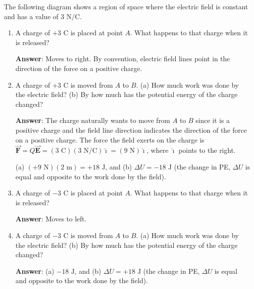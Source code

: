\documentclass{article}
\newcommand{\ihat}[0]{\hat{\boldsymbol{\imath}}}
\newcommand{\bfvec}[1]{\vec{\mathbf{#1}}}
\begin{document}
The following diagram shows a region of space where the electric field is constant and has a value of $3\text{ N/C}$.



\begin{enumerate}

  \item A charge of $+3\text{ C}$ is placed at point $A$. What happens to that charge when it is released?

        \ifsolutions
        {\bf Answer}: Moves to right. By convention, electric field lines point in the direction of the force on a positive charge.
        \else

        \vskip 36pt
        \fi

  \item A charge of $+3\text{ C}$ is moved from $A$ to $B$. (a) How much work was done by the electric field? (b) By how much has the potential energy of the charge changed?

        \ifsolutions
        {\bf Answer}: The charge naturally wants to move from $A$ to $B$ since it is a positive charge and the field line direction indicates the direction of the force on a positive charge. The force the field exerts on the charge is $\bfvec{F}=Q\bfvec{E}=(3\text{ C})(3\text { N/C})\ihat = (9\text{ N})\ihat$, where $\ihat$ points to the right.

        (a) $(+9 \text{ N})(2\text { m})=+18\text{ J}$, and (b) $\Delta U = -18\text{ J}$ (the change in PE, $\Delta U$ is equal and opposite to the work done by the field).
        \else

        \vskip 36pt
        \fi

  \item A charge of $-3\text{ C}$ is placed at point $A$. What happens to that charge when it is released?

        \ifsolutions
        {\bf Answer}: Moves to left.
        \else

        \vskip 48pt
        \fi

  \item A charge of $-3\text{ C}$ is moved from $A$ to $B$. (a) How much work was done by the electric field? (b) By how much has the potential energy of the charge changed?

        \ifsolutions
        {\bf Answer}: (a) $-18\text{ J}$, and (b) $\Delta U = +18\text{ J}$ (the change in PE, $\Delta U$ is equal and opposite to the work done by the field).
        \else


\end{enumerate}
\end{document}
